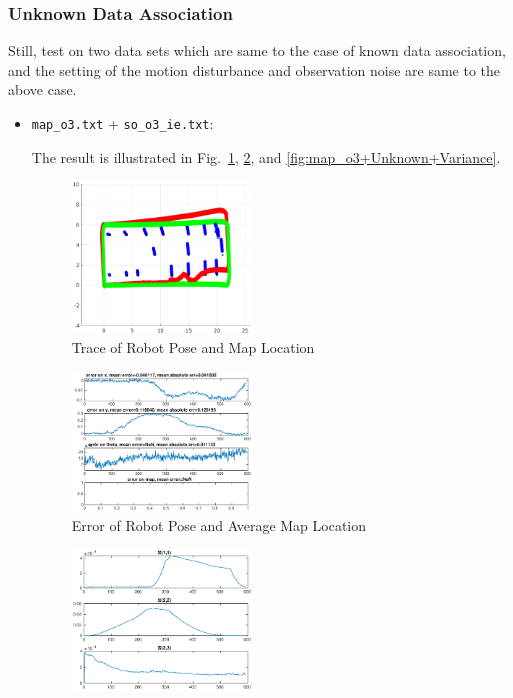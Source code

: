 \documentclass[conference]{IEEEtran}
\begin{document}
\subsubsection{Unknown Data Association}
\par Still, test on two data sets which are same to the case of known data association, and the setting of the motion disturbance and observation noise are same to the above case.
	\begin{itemize}
		\item \texttt{map\_o3.txt} + \texttt{so\_o3\_ie.txt}:
			\par The result is illustrated in Fig.~\ref{fig:map_o3+Unknown+Trace}, \ref{fig:map_o3+Unknown+Error}, and \ref{fig:map_o3+Unknown+Variance}.
				\begin{figure}[htbp]
					\centering
					\includegraphics[width=0.45\textwidth]{map_o3+Unknown+Trace.eps}
					\caption{Trace of Robot Pose and Map Location}
					\label{fig:map_o3+Unknown+Trace}
				\end{figure}
				\begin{figure}[htbp]
					\centering
					\includegraphics[width=0.45\textwidth]{map_o3+Unknown+Error.eps}
					\caption{Error of Robot Pose and Average Map Location}
					\label{fig:map_o3+Unknown+Error}
				\end{figure}
				\begin{figure}[htbp]
					\centering
					\includegraphics[width=0.45\textwidth]{map_o3+Unknown+Variance.eps}

\end{figure}
\end{itemize}
\end{document}
